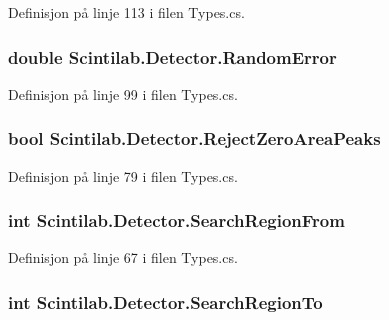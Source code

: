 Definisjon på linje 113 i filen Types.\+cs.

\hypertarget{class_scintilab_1_1_detector_a6f60db064b575425d4e4fd161a8d7a99}{
\subsubsection[{Random\+Error}]{\setlength{\rightskip}{0pt plus 5cm}double Scintilab.\+Detector.\+Random\+Error}}\label{class_scintilab_1_1_detector_a6f60db064b575425d4e4fd161a8d7a99}


Definisjon på linje 99 i filen Types.\+cs.

\hypertarget{class_scintilab_1_1_detector_a9587339739ef2fb6a5a813ac49cf8025}{
\subsubsection[{Reject\+Zero\+Area\+Peaks}]{\setlength{\rightskip}{0pt plus 5cm}bool Scintilab.\+Detector.\+Reject\+Zero\+Area\+Peaks}}\label{class_scintilab_1_1_detector_a9587339739ef2fb6a5a813ac49cf8025}


Definisjon på linje 79 i filen Types.\+cs.

\hypertarget{class_scintilab_1_1_detector_ac146023ebad60cb211ae8845c0477c16}{
\subsubsection[{Search\+Region\+From}]{\setlength{\rightskip}{0pt plus 5cm}int Scintilab.\+Detector.\+Search\+Region\+From}}\label{class_scintilab_1_1_detector_ac146023ebad60cb211ae8845c0477c16}


Definisjon på linje 67 i filen Types.\+cs.

\hypertarget{class_scintilab_1_1_detector_a8ae7ae2c5777ca6ab94e9940979f9b88}{
\subsubsection[{Search\+Region\+To}]{\setlength{\rightskip}{0pt plus 5cm}int Scintilab.\+Detector.\+Search\+Region\+To}}\label{class_scintilab_1_1_detector_a8ae7ae2c5777ca6ab94e9940979f9b88}


